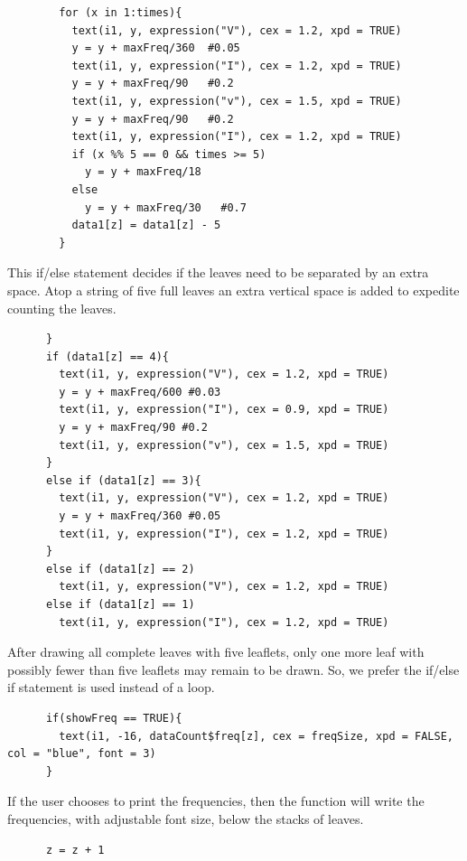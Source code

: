 \begin{verbatim}
        for (x in 1:times){
          text(i1, y, expression("V"), cex = 1.2, xpd = TRUE)
          y = y + maxFreq/360  #0.05
          text(i1, y, expression("I"), cex = 1.2, xpd = TRUE)
          y = y + maxFreq/90   #0.2
          text(i1, y, expression("v"), cex = 1.5, xpd = TRUE)
          y = y + maxFreq/90   #0.2
          text(i1, y, expression("I"), cex = 1.2, xpd = TRUE)
          if (x %% 5 == 0 && times >= 5)
            y = y + maxFreq/18
          else
            y = y + maxFreq/30   #0.7
          data1[z] = data1[z] - 5
        }
\end{verbatim}

This if/else statement decides if the leaves need to be separated by an
extra space. Atop a string of five full leaves an extra vertical space
is added to expedite counting the leaves.

\begin{verbatim}
      }
      if (data1[z] == 4){
        text(i1, y, expression("V"), cex = 1.2, xpd = TRUE)
        y = y + maxFreq/600 #0.03
        text(i1, y, expression("I"), cex = 0.9, xpd = TRUE)
        y = y + maxFreq/90 #0.2
        text(i1, y, expression("v"), cex = 1.5, xpd = TRUE)
      }
      else if (data1[z] == 3){
        text(i1, y, expression("V"), cex = 1.2, xpd = TRUE)
        y = y + maxFreq/360 #0.05
        text(i1, y, expression("I"), cex = 1.2, xpd = TRUE)
      }
      else if (data1[z] == 2)
        text(i1, y, expression("V"), cex = 1.2, xpd = TRUE)
      else if (data1[z] == 1)
        text(i1, y, expression("I"), cex = 1.2, xpd = TRUE)
\end{verbatim}

After drawing all complete leaves with five leaflets, only one more leaf
with possibly fewer than five leaflets may remain to be drawn. So, we
prefer the if/else if statement is used instead of a loop.

\begin{verbatim}
      if(showFreq == TRUE){
        text(i1, -16, dataCount$freq[z], cex = freqSize, xpd = FALSE, col = "blue", font = 3)
      }
\end{verbatim}

If the user chooses to print the frequencies, then the function will
write the frequencies, with adjustable font size, below the stacks of
leaves.

\begin{verbatim}
      z = z + 1
\end{verbatim}

